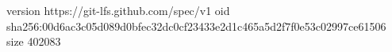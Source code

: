 version https://git-lfs.github.com/spec/v1
oid sha256:00d6ac3c05d089d0bfec32dc0cf23433e2d1c465a5d2f7f0e53c02997ce61506
size 402083

